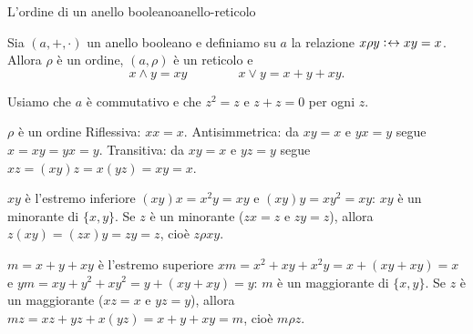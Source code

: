 \begin{concetto}
\begin{Teorema}{L'ordine di un anello booleano}{anello-reticolo}
    \begin{prerequisiti}
    \end{prerequisiti}
    Sia $(a, +, \cdot)$ un anello booleano e definiamo su $a$ la relazione $x \rho y \mathrel{\vcentcolon\mkern1mu\leftrightarrow} xy = x$. Allora $\rho$ è un ordine, $(a, \rho)$ è un reticolo e
    \[ x \wedge y = xy \qquad\qquad x \vee y = x + y + xy. \]
\end{Teorema}
\begin{dimostrazione}
    Usiamo che $a$ è commutativo e che $z^2 = z$ e $z + z = 0$ per ogni $z$.
    \begin{caso}{$\rho$ è un ordine}
        Riflessiva: $xx = x$. Antisimmetrica: da $xy = x$ e $yx = y$ segue $x = xy = yx = y$. Transitiva: da $xy = x$ e $yz = y$ segue $xz = (xy)z = x(yz) = xy = x$.
    \end{caso}
    \begin{caso}{$xy$ è l'estremo inferiore}
        $(xy)x = x^2y = xy$ e $(xy)y = xy^2 = xy$: $xy$ è un minorante di $\{x, y\}$. Se $z$ è un minorante ($zx = z$ e $zy = z$), allora $z(xy) = (zx)y = zy = z$,
        cioè $z \rho xy$.
    \end{caso}
    \begin{caso}{$m = x + y + xy$ è l'estremo superiore}
        $xm = x^2 + xy + x^2y = x + (xy + xy) = x$ e $ym = xy + y^2 + xy^2 = y + (xy + xy) = y$: $m$ è un maggiorante di $\{x, y\}$. Se $z$ è un maggiorante
        ($xz = x$ e $yz = y$), allora $mz = xz + yz + x(yz) = x + y + xy = m$, cioè $m \rho z$.
    \end{caso}
\end{dimostrazione}
\end{concetto}

